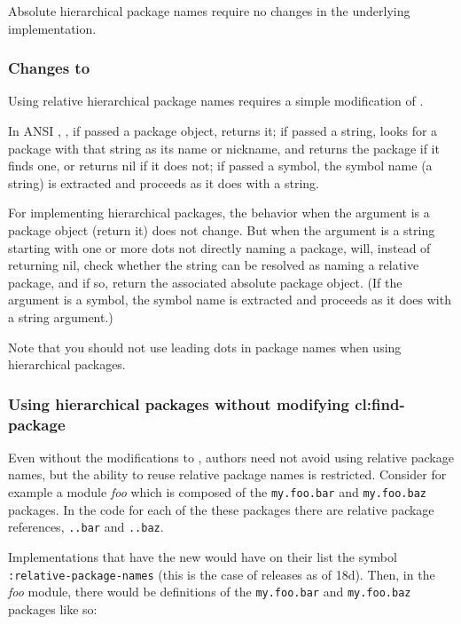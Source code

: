 Absolute hierarchical package names require no changes in the
underlying \clisp{} implementation.


\subsubsection{Changes to }

Using relative hierarchical package names requires a simple
modification of .

In ANSI \clisp{}, , if passed a package object,
returns it; if passed a string,  looks for a
package with that string as its name or nickname, and returns the
package if it finds one, or returns nil if it does not; if passed a
symbol, the symbol name (a string) is extracted and
 proceeds as it does with a string.

For implementing hierarchical packages, the behavior when the argument
is a package object (return it) does not change. But when the argument
is a string starting with one or more dots not directly naming a
package,  will, instead of returning nil, check
whether the string can be resolved as naming a relative package, and
if so, return the associated absolute package object. (If the argument
is a symbol, the symbol name is extracted and 
proceeds as it does with a string argument.)

Note that you should not use leading dots in package names when using
hierarchical packages.

\subsubsection{Using hierarchical packages without modifying cl:find-package}

Even without the modifications to , authors need
not avoid using relative package names, but the ability to reuse
relative package names is restricted. Consider for example a module
\textit{foo} which is composed of the \verb|my.foo.bar| and
\verb|my.foo.baz| packages. In the code for each of the these packages
there are relative package references, \verb|..bar| and \verb|..baz|.

Implementations that have the new  would have on
their  list the symbol \verb|:relative-package-names|
(this is the case of \cmucl{} releases as of 18d). Then, in the
\textit{foo} module, there would be definitions of the
\verb|my.foo.bar| and \verb|my.foo.baz| packages like so:

